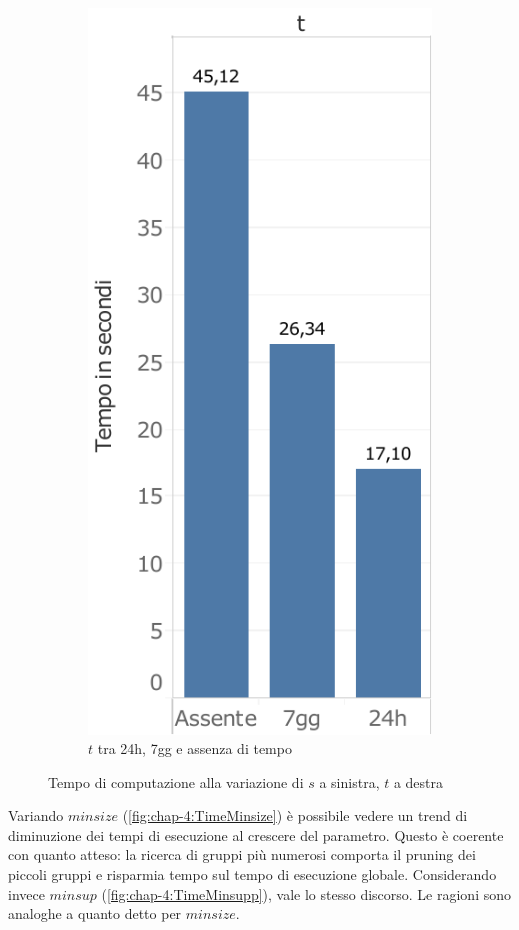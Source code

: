 \begin{figure}
\begin{subfigure}{.5\textwidth}
   \includegraphics[scale=0.5]{res/fig/sec-4/performance/TimeT.pdf}
   \caption{\(t\) tra 24h, 7gg e assenza di tempo}
  \label{fig:chap-4:TimeT}
\end{subfigure}%
  \caption{Tempo di computazione alla variazione di \(s\) a sinistra, \(t\) a destra}%
  \label{fig:chap-4:TimeSandT}
\end{figure}

Variando \(minsize\) (\cref{fig:chap-4:TimeMinsize}) è possibile vedere un trend di diminuzione dei tempi di esecuzione al crescere del parametro.
Questo è coerente con quanto atteso: la ricerca di gruppi più numerosi comporta il pruning dei piccoli gruppi e risparmia tempo sul tempo di esecuzione globale.
Considerando invece \(minsup\) (\cref{fig:chap-4:TimeMinsupp}), vale lo stesso discorso.
Le ragioni sono analoghe a quanto detto per \(minsize\).


